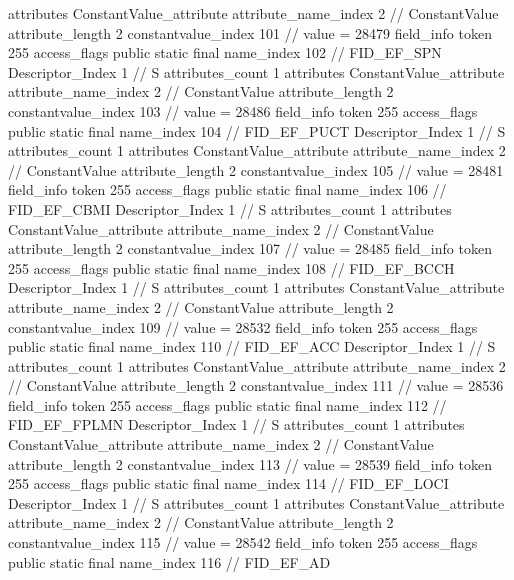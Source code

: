 {{{{{				attributes {
				ConstantValue_attribute {
					attribute_name_index	2		// ConstantValue
					attribute_length	2
					constantvalue_index	101		// value = 28479
				}
				}
			}
			field_info {
				token	255
				access_flags	public static final
				name_index	102		// FID_EF_SPN
				Descriptor_Index	1		// S
				attributes_count	1
				attributes {
				ConstantValue_attribute {
					attribute_name_index	2		// ConstantValue
					attribute_length	2
					constantvalue_index	103		// value = 28486
				}
				}
			}
			field_info {
				token	255
				access_flags	public static final
				name_index	104		// FID_EF_PUCT
				Descriptor_Index	1		// S
				attributes_count	1
				attributes {
				ConstantValue_attribute {
					attribute_name_index	2		// ConstantValue
					attribute_length	2
					constantvalue_index	105		// value = 28481
				}
				}
			}
			field_info {
				token	255
				access_flags	public static final
				name_index	106		// FID_EF_CBMI
				Descriptor_Index	1		// S
				attributes_count	1
				attributes {
				ConstantValue_attribute {
					attribute_name_index	2		// ConstantValue
					attribute_length	2
					constantvalue_index	107		// value = 28485
				}
				}
			}
			field_info {
				token	255
				access_flags	public static final
				name_index	108		// FID_EF_BCCH
				Descriptor_Index	1		// S
				attributes_count	1
				attributes {
				ConstantValue_attribute {
					attribute_name_index	2		// ConstantValue
					attribute_length	2
					constantvalue_index	109		// value = 28532
				}
				}
			}
			field_info {
				token	255
				access_flags	public static final
				name_index	110		// FID_EF_ACC
				Descriptor_Index	1		// S
				attributes_count	1
				attributes {
				ConstantValue_attribute {
					attribute_name_index	2		// ConstantValue
					attribute_length	2
					constantvalue_index	111		// value = 28536
				}
				}
			}
			field_info {
				token	255
				access_flags	public static final
				name_index	112		// FID_EF_FPLMN
				Descriptor_Index	1		// S
				attributes_count	1
				attributes {
				ConstantValue_attribute {
					attribute_name_index	2		// ConstantValue
					attribute_length	2
					constantvalue_index	113		// value = 28539
				}
				}
			}
			field_info {
				token	255
				access_flags	public static final
				name_index	114		// FID_EF_LOCI
				Descriptor_Index	1		// S
				attributes_count	1
				attributes {
				ConstantValue_attribute {
					attribute_name_index	2		// ConstantValue
					attribute_length	2
					constantvalue_index	115		// value = 28542
				}
				}
			}
			field_info {
				token	255
				access_flags	public static final
				name_index	116		// FID_EF_AD
}}}}}
